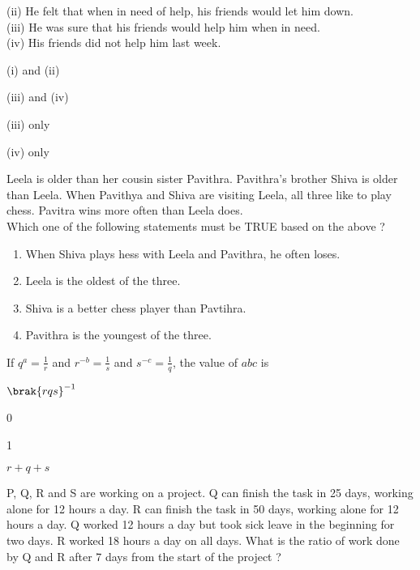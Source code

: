		(ii) He felt that when in need of help, his friends would let him down. \\
		(iii) He was sure that his friends would help him when in need. \\
		(iv) His friends did not help him last week.
		\begin{enumerate}
		\end{enumerate}
	\item Leela is older than her cousin sister Pavithra. Pavithra's brother Shiva is older than Leela. When Pavithya and Shiva are visiting Leela, all three like to play chess. Pavitra wins more often than Leela does. \\
		Which one of the following statements must be TRUE based on the above ?
		\begin{enumerate}
			\item When Shiva plays hess with Leela and Pavithra, he often loses.
			\item Leela is the oldest of the three.
			\item Shiva is a better chess player than Pavtihra.
			\item Pavithra is the youngest of the three.
		\end{enumerate}
	\item If $q^a = \frac{1}{r} $ and $r^{-b} = \frac{1}{s}$ and $s^{-c}=\frac{1}{q}$, the value of $abc$ is 
		\begin{enumerate}
				\begin{multicols}{4}
				\item $\brak{rqs}^{-1}$
				\item 0
				\item 1
				\item $r+q+s$
				\end{multicols}
		\end{enumerate}
	\item P, Q, R and S are working on a project. Q can finish the task in 25 days, working alone for 12 hours a day. R can finish the task in 50 days, working alone for 12 hours a day. Q worked 12 hours a day but took sick leave in the beginning for two days. R worked 18 hours a day on all days. What is the ratio of work done by Q and R after 7 days from the start of the project ?
